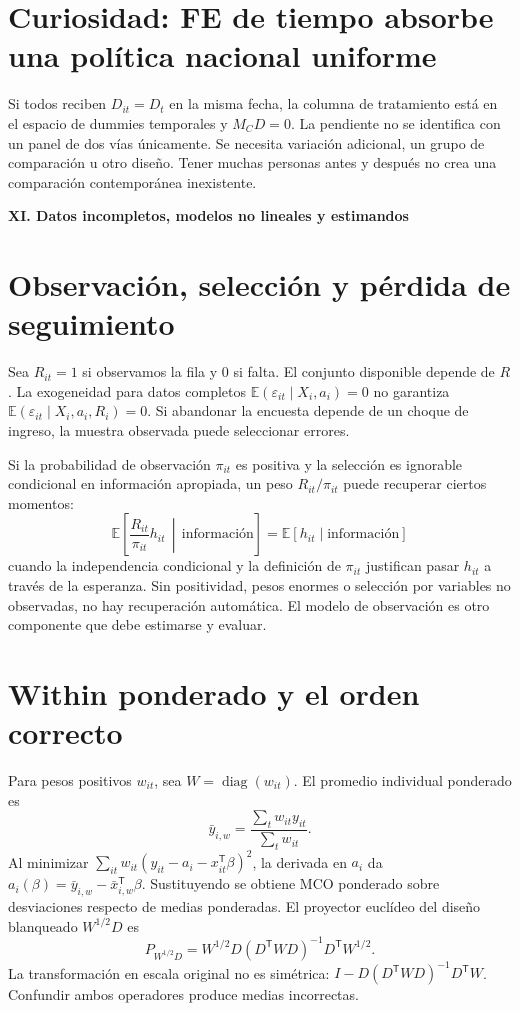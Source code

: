 \documentclass[11pt,a4paper]{article}
\newcommand{\E}{\mathbb E}
\newcommand{\T}{^{\mathsf T}}
\DeclareMathOperator{\diag}{diag}
\theoremstyle{definition}
\newcommand{\parte}[1]{\par\bigskip\Needspace{8\baselineskip}\begin{center}{\Large\bfseries\color{azul}#1}\end{center}}
\newcommand{\eps}{\varepsilon}
\begin{document}
\section{Curiosidad: FE de tiempo absorbe una política nacional uniforme}
Si todos reciben $D_{it}=D_t$ en la misma fecha, la columna de tratamiento está en el espacio de dummies temporales y $M_CD=0$.
La pendiente no se identifica con un panel de dos vías únicamente.
Se necesita variación adicional, un grupo de comparación u otro diseño.
Tener muchas personas antes y después no crea una comparación contemporánea inexistente.



\parte{XI. Datos incompletos, modelos no lineales y estimandos}
\section{Observación, selección y pérdida de seguimiento}
Sea $R_{it}=1$ si observamos la fila y $0$ si falta. El conjunto disponible depende de $R$.
La exogeneidad para datos completos
$\E(\eps_{it}\mid X_i,a_i)=0$
no garantiza
$\E(\eps_{it}\mid X_i,a_i,R_i)=0$.
Si abandonar la encuesta depende de un choque de ingreso, la muestra observada puede seleccionar errores.

Si la probabilidad de observación $\pi_{it}$ es positiva y la selección es ignorable condicional en información apropiada, un peso $R_{it}/\pi_{it}$ puede recuperar ciertos momentos:
\[
\E\left[\frac{R_{it}}{\pi_{it}}h_{it}\,\middle|\,\text{información}\right]
=\E[h_{it}\mid\text{información}]
\]
cuando la independencia condicional y la definición de $\pi_{it}$ justifican pasar $h_{it}$ a través de la esperanza.
Sin positividad, pesos enormes o selección por variables no observadas, no hay recuperación automática.
El modelo de observación es otro componente que debe estimarse y evaluar.

\section{Within ponderado y el orden correcto}
Para pesos positivos $w_{it}$, sea $W=\diag(w_{it})$.
El promedio individual ponderado es
\[
\bar y_{i,w}=\frac{\sum_tw_{it}y_{it}}{\sum_tw_{it}}.
\]
Al minimizar $\sum_{it}w_{it}(y_{it}-a_i-x_{it}\T\beta)^2$,
la derivada en $a_i$ da
$a_i(\beta)=\bar y_{i,w}-\bar x_{i,w}\T\beta$.
Sustituyendo se obtiene MCO ponderado sobre desviaciones respecto de medias ponderadas.
El proyector euclídeo del diseño blanqueado $W^{1/2}D$ es
\[
P_{W^{1/2}D}=W^{1/2}D(D\T WD)^{-1}D\T W^{1/2}.
\]
La transformación en escala original no es simétrica:
$I-D(D\T WD)^{-1}D\T W$.
Confundir ambos operadores produce medias incorrectas.
\end{document}
